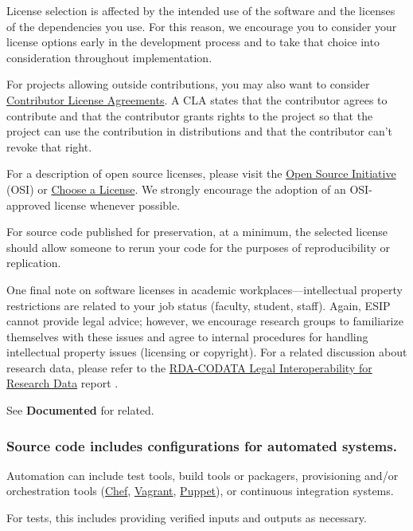 \documentclass{article}
\begin{document}
License selection is affected by the intended use of the software and the licenses of the dependencies you use. For this reason, we encourage you to consider your license options early in the development process and to take that choice into consideration throughout implementation.
 
For projects allowing outside contributions, you may also want to consider \href{https://www.clahub.com/} {Contributor License Agreements}. A CLA states that the contributor agrees to contribute and that the contributor grants rights to the project so that the project can use the contribution in distributions and that the contributor can’t revoke that right.
 
For a description of open source licenses, please visit the \href{https://opensource.org/licenses} {Open Source Initiative} (OSI) or \href{http://choosealicense.com/} {Choose a License}. We strongly encourage the adoption of an OSI-approved license whenever possible.
 
For source code published for preservation, at a minimum, the selected license should allow someone to rerun your code for the purposes of reproducibility or replication. 
 
One final note on software licenses in academic workplaces—intellectual property restrictions are related to your job status (faculty, student, staff). Again, ESIP cannot provide legal advice; however, we encourage research groups to familiarize themselves with these issues and agree to internal procedures for handling intellectual property issues (licensing or copyright). For a related discussion about research data, please refer to the \href{https://rd-alliance.org/sites/default/files/attachment/Legal%20Interoperability%20Principles%20and%20Implementation%20Guidelines_Final.pdf} {RDA-CODATA Legal Interoperability for Research Data} report \autocite{uhlir_legal_2016}.
 
See \textbf{Documented} for related.

\subsubsection{Source code includes configurations for automated systems.}
Automation can include test tools, build tools or packagers, provisioning and/or orchestration tools (\href{https://www.chef.io/} {Chef}, \href{https://www.vagrantup.com/} {Vagrant}, \href{https://puppet.com/} {Puppet}), or continuous integration systems. 
 
For tests, this includes providing verified inputs and outputs as necessary. 
 
\end{document}
